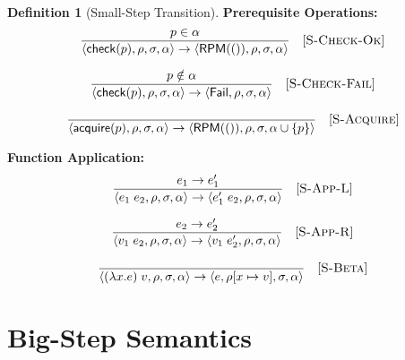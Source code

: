 \documentclass[11pt,twoside,openright]{book}
\theoremstyle{definition}
\newtheorem{definition}{Definition}[chapter]
\theoremstyle{plain}
\theoremstyle{remark}
\newcommand{\smallstep}{\to}
\newcommand{\Failed}{\mathsf{Fail}}
\begin{document}
\begin{definition}[Small-Step Transition]
\textbf{Prerequisite Operations:}
\[
\frac{p \in \alpha}{\langle \mathsf{check}(p), \rho, \sigma, \alpha \rangle \smallstep \langle \mathsf{RPM}(()), \rho, \sigma, \alpha \rangle} \quad [\textsc{S-Check-Ok}]
\]

\[
\frac{p \notin \alpha}{\langle \mathsf{check}(p), \rho, \sigma, \alpha \rangle \smallstep \langle \Failed, \rho, \sigma, \alpha \rangle} \quad [\textsc{S-Check-Fail}]
\]

\[
\frac{}{\langle \mathsf{acquire}(p), \rho, \sigma, \alpha \rangle \smallstep \langle \mathsf{RPM}(()), \rho, \sigma, \alpha \cup \{p\} \rangle} \quad [\textsc{S-Acquire}]
\]

\textbf{Function Application:}
\[
\frac{e_1 \smallstep e_1'}{\langle e_1\; e_2, \rho, \sigma, \alpha \rangle \smallstep \langle e_1'\; e_2, \rho, \sigma, \alpha \rangle} \quad [\textsc{S-App-L}]
\]

\[
\frac{e_2 \smallstep e_2'}{\langle v_1\; e_2, \rho, \sigma, \alpha \rangle \smallstep \langle v_1\; e_2', \rho, \sigma, \alpha \rangle} \quad [\textsc{S-App-R}]
\]

\[
\frac{}{\langle (\lambda x. e)\; v, \rho, \sigma, \alpha \rangle \smallstep \langle e, \rho[x \mapsto v], \sigma, \alpha \rangle} \quad [\textsc{S-Beta}]
\]
\end{definition}

\section{Big-Step Semantics}
\end{document}
